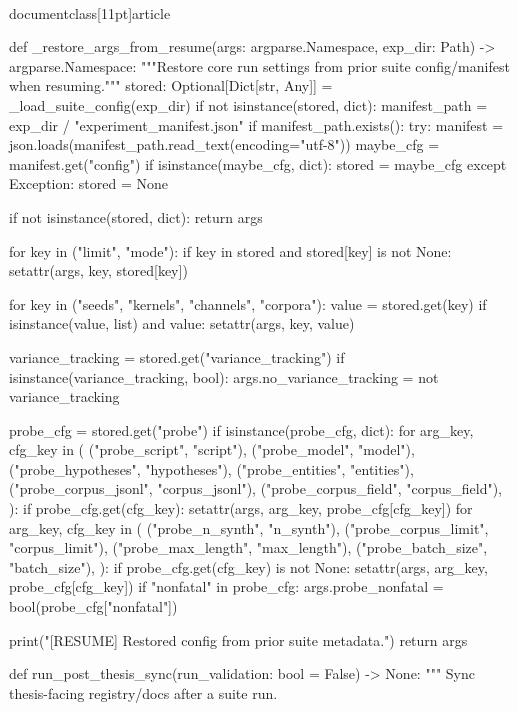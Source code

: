 \\documentclass[11pt]{article}
\begin{document}
\begin{CodeBlock}
def _restore_args_from_resume(args: argparse.Namespace, exp_dir: Path) -> argparse.Namespace:
    """Restore core run settings from prior suite config/manifest when resuming."""
    stored: Optional[Dict[str, Any]] = _load_suite_config(exp_dir)
    if not isinstance(stored, dict):
        manifest_path = exp_dir / "experiment_manifest.json"
        if manifest_path.exists():
            try:
                manifest = json.loads(manifest_path.read_text(encoding="utf-8"))
                maybe_cfg = manifest.get("config")
                if isinstance(maybe_cfg, dict):
                    stored = maybe_cfg
            except Exception:
                stored = None

    if not isinstance(stored, dict):
        return args

    for key in ("limit", "mode"):
        if key in stored and stored[key] is not None:
            setattr(args, key, stored[key])

    for key in ("seeds", "kernels", "channels", "corpora"):
        value = stored.get(key)
        if isinstance(value, list) and value:
            setattr(args, key, value)

    variance_tracking = stored.get("variance_tracking")
    if isinstance(variance_tracking, bool):
        args.no_variance_tracking = not variance_tracking

    probe_cfg = stored.get("probe")
    if isinstance(probe_cfg, dict):
        for arg_key, cfg_key in (
            ("probe_script", "script"),
            ("probe_model", "model"),
            ("probe_hypotheses", "hypotheses"),
            ("probe_entities", "entities"),
            ("probe_corpus_jsonl", "corpus_jsonl"),
            ("probe_corpus_field", "corpus_field"),
        ):
            if probe_cfg.get(cfg_key):
                setattr(args, arg_key, probe_cfg[cfg_key])
        for arg_key, cfg_key in (
            ("probe_n_synth", "n_synth"),
            ("probe_corpus_limit", "corpus_limit"),
            ("probe_max_length", "max_length"),
            ("probe_batch_size", "batch_size"),
        ):
            if probe_cfg.get(cfg_key) is not None:
                setattr(args, arg_key, probe_cfg[cfg_key])
        if "nonfatal" in probe_cfg:
            args.probe_nonfatal = bool(probe_cfg["nonfatal"])

    print("[RESUME] Restored config from prior suite metadata.")
    return args


def run_post_thesis_sync(run_validation: bool = False) -> None:
    """
    Sync thesis-facing registry/docs after a suite run.


\end{CodeBlock}
\end{document}
